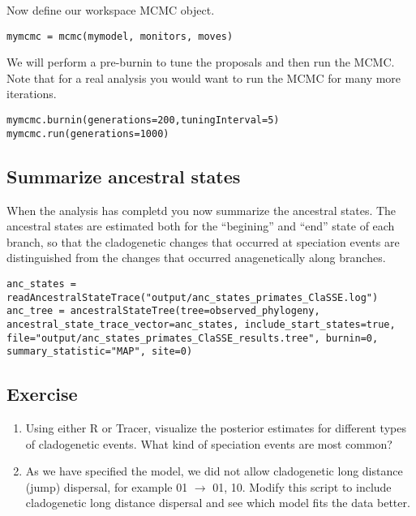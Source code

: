 Now define our workspace MCMC object.
{\tt \begin{snugshade*}
\begin{lstlisting}
mymcmc = mcmc(mymodel, monitors, moves)
\end{lstlisting}
\end{snugshade*}}

We will perform a pre-burnin to tune the proposals
and then run the MCMC. Note that for a real analysis you would
want to run the MCMC for many more iterations.
{\tt \begin{snugshade*}
\begin{lstlisting}
mymcmc.burnin(generations=200,tuningInterval=5)
mymcmc.run(generations=1000)
\end{lstlisting}
\end{snugshade*}}

\subsection{Summarize ancestral states}

When the analysis has completd you now summarize the ancestral states. 
The ancestral states are estimated both for the ``begining'' and ``end''
state of each branch, so that the cladogenetic changes that occurred at speciation events
are distinguished from the changes that occurred anagenetically along branches.
{\tt \begin{snugshade*}
\begin{lstlisting}
anc_states = readAncestralStateTrace("output/anc_states_primates_ClaSSE.log")
anc_tree = ancestralStateTree(tree=observed_phylogeny, ancestral_state_trace_vector=anc_states, include_start_states=true, file="output/anc_states_primates_ClaSSE_results.tree", burnin=0, summary_statistic="MAP", site=0)
\end{lstlisting}
\end{snugshade*}}


\subsection{Exercise}

\begin{enumerate}
\item Using either R or Tracer, visualize the posterior estimates for different types of cladogenetic events. 
    What kind of speciation events are most common?
\item As we have specified the model, we did not allow cladogenetic long
    distance (jump) dispersal, for example 01 $\rightarrow$ 01, 10.
    Modify this script to include cladogenetic 
    long distance dispersal and see which model fits the data better.
\end{enumerate}

\newpage


